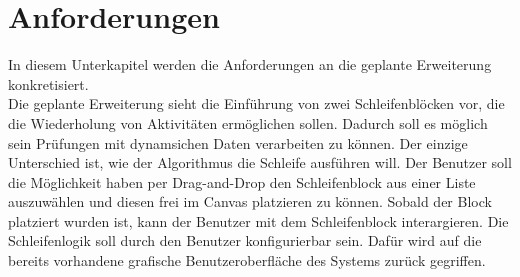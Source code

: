     \section{Anforderungen}
    \label{Anforderungen}
    In diesem Unterkapitel werden die Anforderungen an die geplante Erweiterung konkretisiert.
    \\
    Die geplante Erweiterung sieht die Einführung von zwei Schleifenblöcken vor, die die Wiederholung von Aktivitäten ermöglichen sollen. 
    Dadurch soll es möglich sein Prüfungen mit dynamsichen Daten verarbeiten zu können.
    Der einzige Unterschied ist, wie der Algorithmus die Schleife ausführen will.
    Der Benutzer soll die Möglichkeit haben per Drag-and-Drop den Schleifenblock aus einer Liste auszuwählen und diesen frei im Canvas platzieren zu können.
    Sobald der Block platziert wurden ist, kann der Benutzer mit dem Schleifenblock interargieren.
    Die Schleifenlogik soll durch den Benutzer konfigurierbar sein. 
    Dafür wird auf die bereits vorhandene grafische Benutzeroberfläche des Systems zurück gegriffen.
